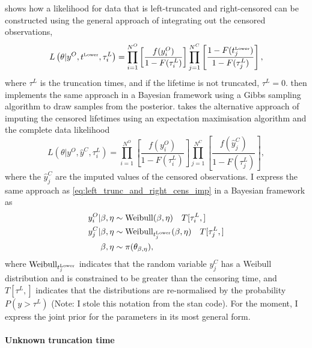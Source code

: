 \citet{hong2009} shows how a likelihood for data that is left-truncated and right-censored can be constructed using the general approach of integrating out the censored observations,
\begin{equation}
    \label{eq:left_trunc_and_right_cens_int}
    L\left(\theta|y^O, t^{\hbox{\tiny{Lower}}}, \tau^L_i\right) = \prod^{N^O}_{i = 1}\left[\frac{f(y^O_i)}{1 - F(\tau^L_i)} \right] \prod^{N^C}_{j = 1}\left[\frac{1 - F(t^{\hbox{\tiny{Lower}}}_j)}{1 - F(\tau^L_j)}\right],
\end{equation}
where $\tau^L$ is the truncation times, and if the lifetime is not truncated, $\tau^L = 0$. \citet{kundu2016} then implements the same approach in a Bayesian framework using a Gibbs sampling algorithm to draw samples from the posterior. \citet{mitra2013} takes the alternative approach of imputing the censored lifetimes using an expectation maximisation algorithm and the complete data likelihood
\begin{equation}
    \label{eq:left_trunc_and_right_cens_imp}
    L\left(\theta|y^O, \hat{y}^C, \tau^L_i\right) = \prod^{N^O}_{i = 1}\left[\frac{f(y^O_i)}{1 - F(\tau^L_i)} \right] \prod^{N^C}_{j = 1}\left[\frac{f(\hat{y}^C_j)}{1 - F(\tau^L_j)}\right],
\end{equation}
where the $\hat{y}^C_j$ are the imputed values of the censored observations. I express the same approach as \ref{eq:left_trunc_and_right_cens_imp} in a Bayesian framework as
\begin{align*}
    y^O_i|\beta, \eta & \sim \hbox{Weibull}(\beta, \eta) \quad T[\tau^L_i, ]\\
    y^C_j|\beta, \eta & \sim \hbox{Weibull}_{t^{\hbox{\tiny{Lower}}}_j}(\beta, \eta) \quad T[\tau^L_j, ] \\
    \beta, \eta & \sim \pi(\theta_{\beta, \eta}),
\end{align*}
where $\hbox{Weibull}_{t^{\hbox{\tiny{Lower}}}_j}$ indicates that the random variable $y^C_j$ has a Weibull distribution and is constrained to be greater than the censoring time, and $T[\tau^L, ]$ indicates that the distributions are re-normalised by the probability $P(y > \tau^L)$ (Note: I stole this notation from the stan code). For the moment, I express the joint prior for the parameters in its most general form.

\paragraph{Unknown truncation time}

